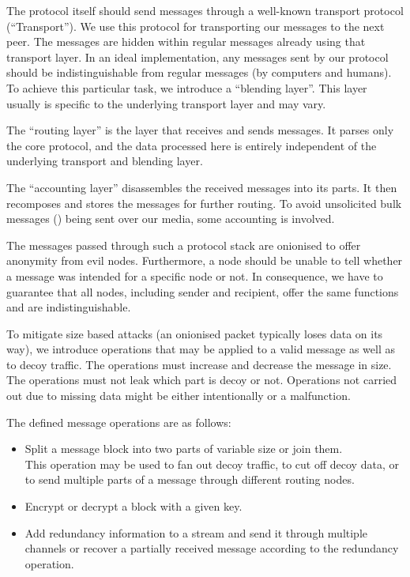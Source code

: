 The protocol itself should send messages through a well-known transport protocol (``Transport''). We use this protocol for transporting our messages to the next peer. The messages are hidden within regular messages already using that transport layer. In an ideal implementation, any messages sent by our protocol should be indistinguishable from regular messages (by computers and humans). To achieve this particular task, we introduce a ``blending layer''. This layer usually is specific to the underlying transport layer and may vary.

The ``routing layer'' is the layer that receives and sends messages. It parses only the core protocol, and the data processed here is entirely independent of the underlying transport and blending layer.

The ``accounting layer'' disassembles the received messages into its parts. It then recomposes and stores the messages for further routing. To avoid unsolicited bulk messages () being sent over our media, some accounting is involved. 

The messages passed through such a protocol stack are onionised to offer anonymity from evil nodes. Furthermore, a node should be unable to tell whether a message was intended for a specific node or not. In consequence, we have to guarantee that all nodes, including sender and recipient, offer the same functions and are indistinguishable.

To mitigate size based attacks (an onionised packet typically loses data on its way), we introduce operations that may be applied to a valid message as well as to decoy traffic. The operations must increase and decrease the message in size. The operations must not leak which part is decoy or not. Operations not carried out due to missing data might be either intentionally or a malfunction.

The defined message operations are as follows:
\begin{itemize}
	\item Split a message block into two parts of variable size or join them.\\
	This operation may be used to fan out decoy traffic, to cut off decoy data, or to send multiple parts of a message through different routing nodes.
	\item Encrypt or decrypt a block with a given key.      
	\item Add redundancy information to a stream and send it through multiple channels or recover a partially received message according to the redundancy operation.
\end{itemize}

